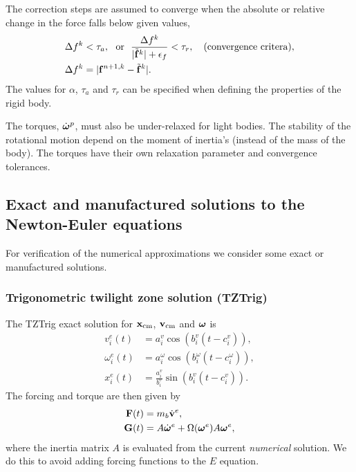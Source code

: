 The correction steps are assumed to converge when the absolute or relative change in the force falls below given values, 
\begin{align}
    \Delta f^k  &< \tau_a, \text{~~or~~} { \Delta f^k \over \vert \tilde{\mathbf{ f}}^{k} \vert +\epsilon_f} < \tau_r , \quad\text{(convergence critera)}, \\
    \Delta f^k  &=  \vert \mathbf{ f}^{n+1,k} - \tilde{\mathbf{ f}}^{k} \vert.
\end{align}
The values for $\alpha$, $\tau_a$ and $\tau_r$ can be specified when defining the properties of the rigid body.


The torques, $\dot{\boldsymbol{\omega}}^p$, must also be under-relaxed for light bodies. The stability of the rotational motion depend on the
moment of inertia's (instead of the mass of the body). The torques have their own relaxation parameter and convergence
tolerances.


\subsection{Exact and manufactured solutions to the Newton-Euler equations}


For verification of the numerical approximations we consider some exact or manufactured solutions.

\subsubsection{Trigonometric twilight zone solution (TZTrig)}

  The TZTrig exact solution for $\mathbf{ x}_{\rm cm}$, $\mathbf{ v}_{\rm cm}$ and $\boldsymbol{\omega}$ is 
\begin{align}
   v_i^{e}(t) & = a_i^v \cos( b_i^v ( t - c_i^v ) ) , \\
  \omega_i^{e}(t) & = a_i^\omega \cos( b_i^\omega( t - c_i^\omega) ),  \\
   x_i^{e}(t) & = \frac{a_i^v}{b_i^v} \sin( b_i^v ( t - c_i^v ) ) . 
\end{align}
The forcing and torque are then given by 
\begin{align}
   \mathbf{ F}(t) &= m_{b} \dot{\mathbf{ v}}^{e}, \\
   \mathbf{ G}(t) &= A \dot{\boldsymbol{\omega}}^{e} + \Omega(\boldsymbol{\omega}^e) A \boldsymbol{\omega}^{e}, 
\end{align}
where the inertia matrix $A$ is evaluated from the current {\em numerical} solution. We do this to avoid
adding forcing functions to the $E$ equation. 

